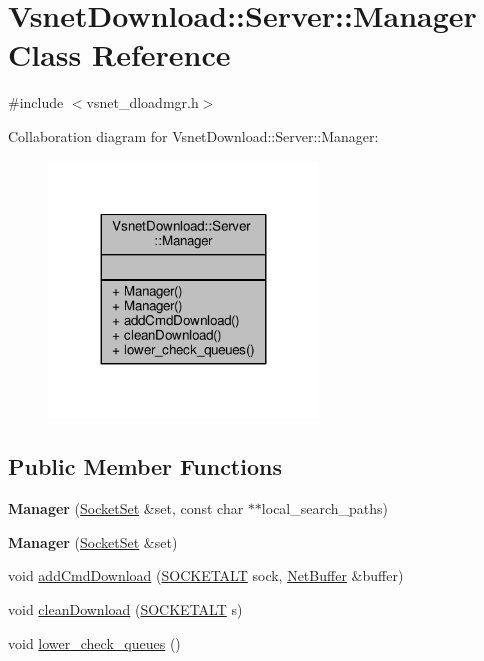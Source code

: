 \hypertarget{classVsnetDownload_1_1Server_1_1Manager}{}\section{Vsnet\+Download\+:\+:Server\+:\+:Manager Class Reference}
\label{classVsnetDownload_1_1Server_1_1Manager}


{\ttfamily \#include $<$vsnet\+\_\+dloadmgr.\+h$>$}



Collaboration diagram for Vsnet\+Download\+:\+:Server\+:\+:Manager\+:
\nopagebreak
\begin{figure}[H]
\begin{center}
\leavevmode
\includegraphics[width=203pt]{d9/d8d/classVsnetDownload_1_1Server_1_1Manager__coll__graph}
\end{center}
\end{figure}
\subsection*{Public Member Functions}
\begin{DoxyCompactItemize}
\item 
{\bfseries Manager} (\hyperlink{classSocketSet}{Socket\+Set} \&set, const char $\ast$$\ast$local\+\_\+search\+\_\+paths)\hypertarget{classVsnetDownload_1_1Server_1_1Manager_af7888d23cb9a3ea4d2307ece74e0f9fc}{}\label{classVsnetDownload_1_1Server_1_1Manager_af7888d23cb9a3ea4d2307ece74e0f9fc}

\item 
{\bfseries Manager} (\hyperlink{classSocketSet}{Socket\+Set} \&set)\hypertarget{classVsnetDownload_1_1Server_1_1Manager_afe4971497a6953ae458b745220ee3007}{}\label{classVsnetDownload_1_1Server_1_1Manager_afe4971497a6953ae458b745220ee3007}

\item 
void \hyperlink{classVsnetDownload_1_1Server_1_1Manager_a13b3ea2c81edc5aa79b992921017c370}{add\+Cmd\+Download} (\hyperlink{classSOCKETALT}{S\+O\+C\+K\+E\+T\+A\+LT} sock, \hyperlink{classNetBuffer}{Net\+Buffer} \&buffer)
\item 
void \hyperlink{classVsnetDownload_1_1Server_1_1Manager_ac92eead82876c392edce9db03bfb053a}{clean\+Download} (\hyperlink{classSOCKETALT}{S\+O\+C\+K\+E\+T\+A\+LT} s)
\item 
void \hyperlink{classVsnetDownload_1_1Server_1_1Manager_ae8dab1180970773032769c9684102bf2}{lower\+\_\+check\+\_\+queues} ()
\end{DoxyCompactItemize}


